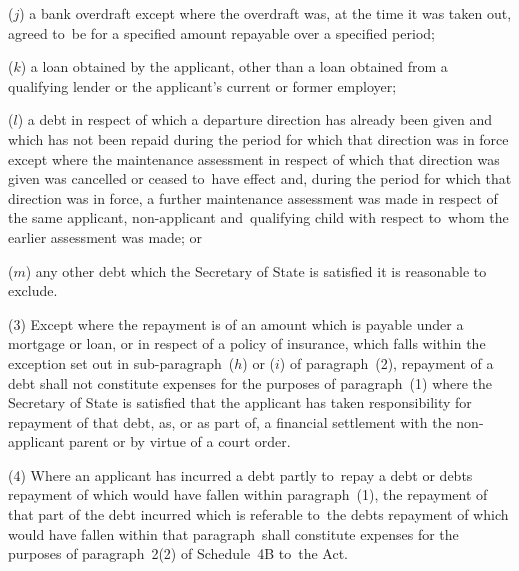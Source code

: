 \documentclass[12pt,a4paper]{article}
\begin{document}
\begin{enumerate}
($j$) a bank overdraft except where the overdraft was, at the time it was taken
out, agreed to~be for a specified amount repayable over a specified period;

($k$) a loan obtained by the applicant, other than a loan obtained from a
qualifying lender or the applicant’s current or former employer;

($l$) a debt in respect of which a departure direction has already been given and
which has not been repaid during the period for which that direction was in
force except where the maintenance assessment in respect of which that direction
was given was cancelled or ceased to~have effect and, during the period for
which that direction was in force, a further maintenance assessment was made in
respect of the same applicant, non-applicant and~qualifying child with respect
to~whom the earlier assessment was made; or

($m$) any other debt which the Secretary of State is satisfied it is reasonable to
exclude.
\end{enumerate}

(3) Except where the repayment is of an amount which is payable under a mortgage
or loan, or in respect of a policy of insurance, which falls within the
exception set out in sub-paragraph~($h$) or ($i$) of paragraph~(2), repayment of a
debt shall not constitute expenses for the purposes of paragraph~(1) where the
Secretary of State is satisfied that the applicant has taken responsibility for
repayment of that debt, as, or as part of, a financial settlement with the
non-applicant parent or by virtue of a court order.

(4) Where an applicant has incurred a debt partly to~repay a debt or debts
repayment of which would have fallen within paragraph~(1), the repayment of that
part of the debt incurred which is referable to~the debts repayment of which
would have fallen within that paragraph~shall constitute expenses for the
purposes of paragraph~2(2) of Schedule~4B to~the Act.
\end{document}
